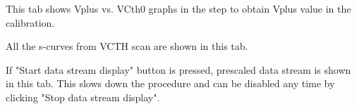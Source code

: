 \documentclass[11pt,a4paper]{article}
\begin{document}
\begin{description}[style=nextline]
	\item[Vplus vs. VCth0 Graphs]
	This tab shows Vplus vs. VCth0 graphs in the step to obtain Vplus value in the calibration. 

	\item[Scurve Histograms]
	All the s-curves from VCTH scan are shown in this tab.

	\item[Data]
	If "Start data stream display" button is pressed, prescaled data stream is shown in this tab.  This slows down the procedure and can be disabled
	any time by clicking "Stop data stream display".

	\end{description}

	
	
	
\end{document}
